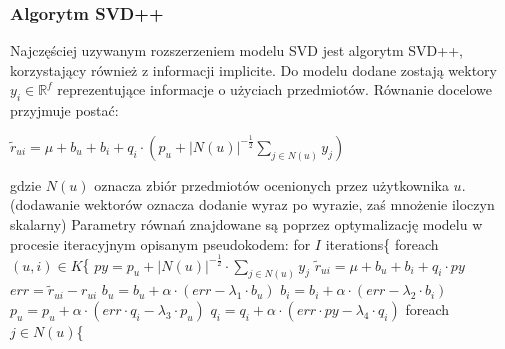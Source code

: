 \documentclass{pracamgr}
\begin{document}
    \subsubsection{Algorytm SVD++}
     Najczęściej uzywanym rozszerzeniem modelu SVD jest algorytm SVD++, korzystający również z informacji implicite.
     Do modelu dodane zostają wektory $y_i\in\mathbb{R}^f$ reprezentujące informacje o użyciach przedmiotów.
     Równanie docelowe przyjmuje postać:
     \begin{center}
      $\tilde{r}_{ui}=\mu+b_u+b_i+q_i\cdot\left(p_u +|N(u)|^{-\frac{1}{2}}\sum\limits_{j\in N(u)}y_j\right)$
     \end{center}
     gdzie $N(u)$ oznacza zbiór przedmiotów ocenionych przez użytkownika $u$.\newline
     {\scriptsize
      (dodawanie wektorów oznacza dodanie wyraz po wyrazie, zaś mnożenie iloczyn skalarny)
     }\newline
     Parametry równań znajdowane są poprzez optymalizację modelu w procesie iteracyjnym opisanym pseudokodem:\newline\newline
    \hspace*{16pt}	for $I$ iterations\{\newline
    \hspace*{32pt}		foreach $(u,i)\in K$\{\newline
    \hspace*{48pt}			$py=p_u +|N(u)|^{-\frac{1}{2}}\cdot\sum\limits_{j\in N(u)}y_j$\newline
    \hspace*{48pt}			$\tilde{r}_{ui}=\mu+b_u+b_i+q_i\cdot py$\newline
    \hspace*{48pt}			$err=\tilde{r}_{ui}-r_{ui}$\newline
    \hspace*{48pt}			$b_u=b_u+\alpha\cdot(err-\lambda_1\cdot b_u)$\newline
    \hspace*{48pt}			$b_i=b_i+\alpha\cdot(err-\lambda_2\cdot b_i)$\newline
    \hspace*{48pt}			$p_u=p_u+\alpha\cdot(err\cdot q_i-\lambda_3\cdot p_u)$\newline
    \hspace*{48pt}			$q_i=q_i+\alpha\cdot(err\cdot py-\lambda_4\cdot q_i)$\newline
    \hspace*{48pt}			foreach $j\in N(u)$\{\newline
\end{document}
